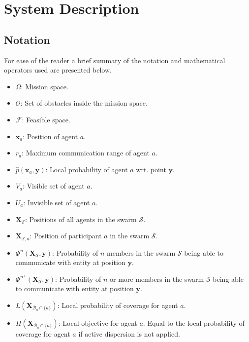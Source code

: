 \section{System Description}

\subsection{Notation}
For ease of the reader a brief summary of the notation and mathematical operators used are presented below.
\begin{itemize}
  \item $\Omega$: Mission space.
  \item $\mathcal{O}$: Set of obstacles inside the mission space.
  \item $\mathcal{F}$: Feasible space.
  \item $\mathbf{x}_{a}$: Position of agent $a$.
  \item $r_{a}$: Maximum communication range of agent $a$.
  \item $\hat{p}(\mathbf{x}_{a}, \mathbf{y})$: Local probability of agent $a$ wrt. point $\mathbf{y}$.
  \item $V_{a}$: Visible set of agent $a$.
  \item $U_{a}$: Invisible set of agent $a$.
  \item $\mathbf{X}_{\mathcal{S}}$: Positions of all agents in the swarm $\mathcal{S}$.
  \item $\mathbf{X}_{\mathcal{S}, a}$: Position of participant $a$ in the swarm $\mathcal{S}$.
  \item $\Phi^{n}(\mathbf{X_{\mathcal{S}}}, \mathbf{y})$: Probability of $n$ members in the swarm $\mathcal{S}$ being able to communicate with entity at position $\mathbf{y}$.
  \item $\Phi^{n^{+}}(\mathbf{X_{\mathcal{S}}}, \mathbf{y})$: Probability of $n$ or more members in the swarm $\mathcal{S}$ being able to communicate with entity at position $\mathbf{y}$.
  \item $L(\mathbf{X}_{\mathcal{B}_{a}\cap\{a\}})$: Local probability of coverage for agent $a$.
  \item $H(\mathbf{X}_{\mathcal{B}_{a}\cap\{a\}})$: Local objective for agent $a$. Equal to the local probability of coverage for agent $a$ if active dispersion is not applied.
\end{itemize}
